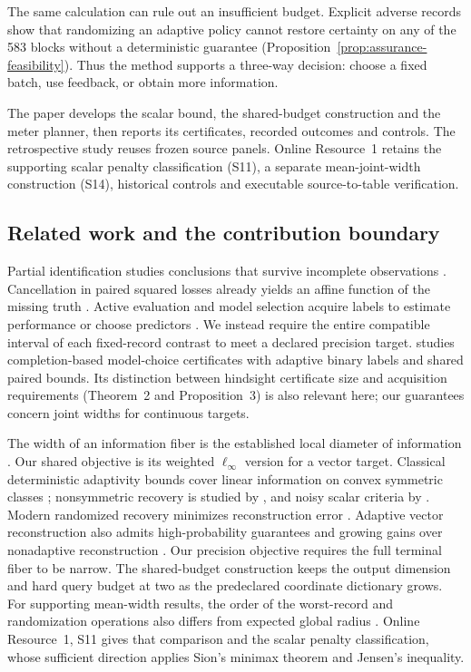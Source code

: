 The same calculation can rule out an insufficient budget. Explicit adverse
records show that randomizing an adaptive policy cannot restore certainty
on any of the 583 blocks without a deterministic guarantee
(Proposition~\ref{prop:assurance-feasibility}). Thus the method supports a
three-way decision: choose a fixed batch, use feedback, or obtain more
information.

The paper develops the scalar bound, the shared-budget construction and the
meter planner, then reports its certificates, recorded outcomes and controls.
The retrospective study reuses frozen source panels. Online Resource~1
retains the supporting scalar penalty classification (S11), a separate
mean-joint-width construction (S14), historical controls and executable
source-to-table verification.

\subsection{Related work and the contribution boundary}
Partial identification studies conclusions that survive incomplete
observations \citep{manski,polo}. Cancellation in paired squared losses
already yields an affine function of the missing truth \citep{patton}.
Active evaluation and model selection acquire labels to estimate performance
or choose predictors \citep{sawade,hara,active,okanovic2025}. We instead
require the entire compatible interval of each fixed-record contrast to
meet a declared precision target. \citet[Theorem~1 and Proposition~1]{kuboyama2026}
studies completion-based model-choice certificates with adaptive binary
labels and shared paired bounds. Its distinction between hindsight certificate
size and acquisition requirements (Theorem~2 and Proposition~3) is also
relevant here; our guarantees concern joint widths for continuous targets.

The width of an information fiber is the established local diameter of
information \citep[Section~4.1]{novak2008}. Our shared objective is its
weighted $\ell_\infty$ version for a vector target. Classical deterministic
adaptivity bounds cover linear information on convex symmetric classes
\citep[Theorems~4.4--4.5]{novak2008}; nonsymmetric recovery is studied by
\citet{novak1995}, and noisy scalar criteria by
\citet[Theorems~2--3 and~5]{osipenko}. Modern randomized recovery minimizes
reconstruction error \citep[Section~2 and Proposition~4.1]{krieg2025}
\citep[Section~9.1, Eq.~(9.15), author manuscript v2]{krieg2026}.
Adaptive vector reconstruction also admits high-probability guarantees and
growing gains over nonadaptive reconstruction
\citep[Theorems~3.1 and~4.1, author manuscript v1]{kunsch2026}.
Our precision objective requires the full terminal fiber to be narrow.
The shared-budget construction keeps the output dimension and hard query
budget at two as the predeclared coordinate dictionary grows.
For supporting mean-width results, the order of the
worst-record and randomization operations also differs from expected global
radius \citep[Eq.~(2.4), Remark~6.1, author manuscript v2]{krieg2026}.
Online Resource~1, S11 gives that comparison and the scalar penalty
classification, whose sufficient direction applies Sion's minimax theorem
\citep[Theorem~3.4]{sion1958} and Jensen's inequality.

